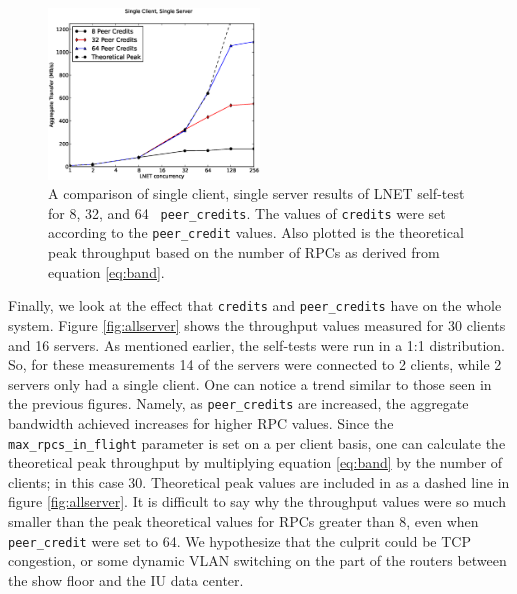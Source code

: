 \documentclass[]{sigplan-proc}
\begin{document}
\begin{figure}
\centering
\includegraphics[width=0.50\textwidth]{figures/ss_plot.eps}
\caption{A comparison of single client, single server results of LNET self-test for 8, 32, and 64 {\tt
    peer\_credits}. The values of {\tt credits} were set according to the {\tt peer\_credit} values. Also
  plotted is the theoretical peak throughput based on the number of RPCs as derived from equation \ref{eq:band}.}
\label{fig:singleserver}
\end{figure}

Finally, we look at the effect that {\tt credits} and {\tt peer\_credits} have on the whole system. Figure
\ref{fig:allserver} shows the throughput values measured for 30 clients and 16 servers. As mentioned earlier,
the self-tests were run in a 1:1 distribution. So, for these measurements 14 of the servers were connected to
2 clients, while 2 servers only had a single client. One can notice a trend similar to those seen in the
previous figures. Namely, as {\tt peer\_credits} are increased, the aggregate bandwidth achieved increases for
higher RPC values. Since the {\tt max\_rpcs\_in\_flight} parameter is set on a per client basis, one can
calculate the theoretical peak throughput by multiplying equation \ref{eq:band} by the number of clients; in
this case 30. Theoretical peak values are included in as a dashed line in figure \ref{fig:allserver}. It is
difficult to say why the throughput values were so much smaller than the peak theoretical values for RPCs
greater than 8, even when {\tt peer\_credit} were set to 64. We hypothesize that the culprit could be TCP
congestion, or some dynamic VLAN switching on the part of the routers between the show floor and the IU data
center. 
\end{document}
